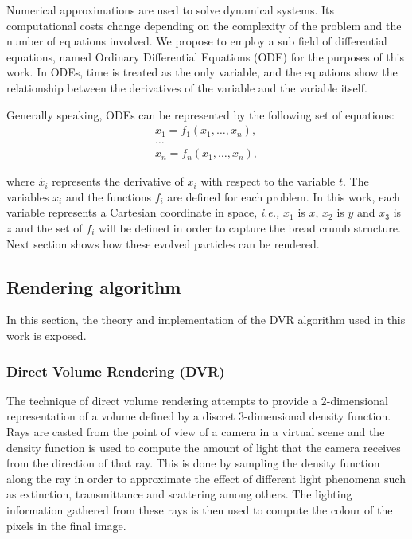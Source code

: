 \documentclass[oneside,a4paper,english,links]{amca}
\begin{document}
Numerical approximations are used to solve dynamical systems. Its computational costs change depending on the complexity of the problem and the number of equations involved. We propose to employ a sub field of differential equations, named Ordinary Differential Equations (ODE) for the purposes of this work. In ODEs, time is treated as the only variable, and the equations show the relationship between the derivatives of the variable and the variable itself. 

Generally speaking, ODEs can be represented by the following set of equations:
\begin{equation} \label{eq:simple}  
  \begin{aligned}
    \dot{x_{1}} = f_{1}(x_{1},\ldots,x_{n}),\\
    \ldots\\
    \dot{x_{n}} = f_{n}(x_{1},\ldots,x_{n}),
  \end{aligned}
\end{equation}

where $\dot{x_{i}}$ represents the derivative of $x_{i}$ with respect to the variable $t$. The variables $x_{i}$ and the functions $f_{i}$ are defined for each problem. In this work, each variable represents a Cartesian coordinate in space, {\em i.e.,} $x_{1}$ is $x$, $x_{2}$ is $y$ and $x_{3}$ is $z$ and the set of $f_{i}$ will be defined in order to capture the bread crumb structure. Next section shows how these evolved particles can be rendered.


\subsection{Rendering algorithm}

In this section, the theory and implementation of the DVR algorithm used in this work is exposed.

\subsubsection{Direct Volume Rendering (DVR)}

The technique of direct volume rendering attempts to provide a
2-dimensional representation of a volume defined by a discret
3-dimensional density function. Rays are casted from the point of view
of a camera in a virtual scene and the density function is used to
compute the amount of light that the camera receives from the
direction of that ray. This is done by sampling the density function
along the ray in order to approximate the effect of different light
phenomena such as extinction, transmittance and scattering among
others. The lighting information gathered from these rays is then
used to compute the colour of the pixels in the final image.
\end{document}
